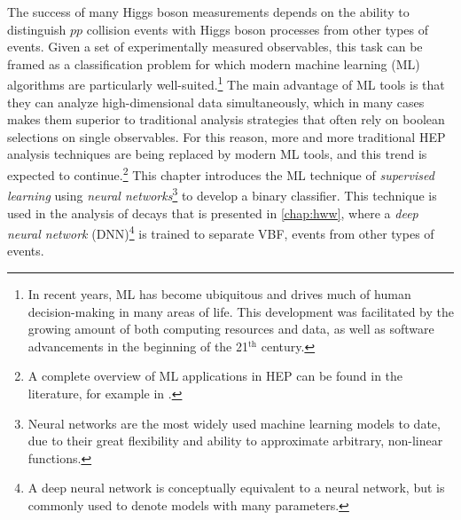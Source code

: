 The success of many Higgs boson measurements depends on the ability to distinguish $pp$ collision events with Higgs boson processes from other types of events. Given a set of experimentally measured observables, this task can be framed as a classification problem for which modern machine learning (ML) algorithms are particularly well-suited.\footnote{In recent years, ML has become ubiquitous and drives much of human decision-making in many areas of life. This development was facilitated by the growing amount of both computing resources and data, as well as software advancements in the beginning of the 21$^{\text{th}}$ century.}
The main advantage of ML tools is that they can analyze high-dimensional data simultaneously, which in many cases makes them superior to traditional analysis strategies that often rely on boolean selections on single observables. 
For this reason, more and more traditional HEP analysis techniques are being replaced by modern ML tools, and this trend is expected to continue.\footnote{A complete overview of ML applications in HEP can be found in the literature, for example in .}
This chapter introduces the ML technique of \emph{supervised learning} using \emph{neural networks}\footnote{Neural networks are the most widely used machine learning models to date, due to their great flexibility and ability to approximate arbitrary, non-linear functions.} to develop a binary classifier.
This technique is used in the analysis of \HWW decays that is presented in \cref{chap:hww}, where a \emph{deep neural network} (DNN)\footnote{A deep neural network is conceptually equivalent to a neural network, but is commonly used to denote models with many parameters.} is trained to separate VBF, \HWW events from other types of events.

